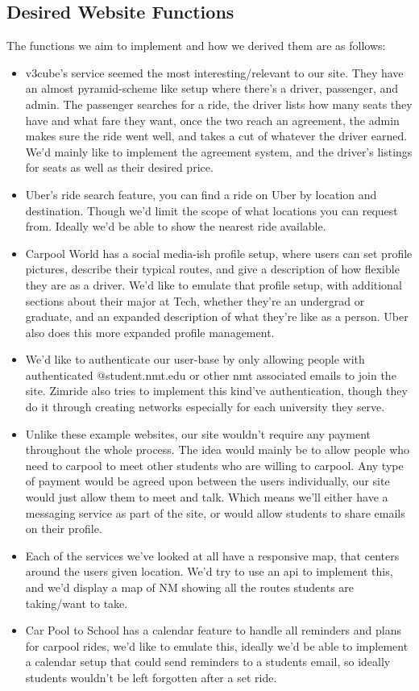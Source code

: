 \documentclass[10pt]{article}
\begin{document}
\subsection{Desired Website Functions}
The functions we aim to implement and how we derived them are as follows: 
\begin{itemize}
  \item v3cube's service seemed the most interesting/relevant to our site. They have an almost pyramid-scheme like setup where there's a driver, passenger, and admin. The passenger searches for a ride, the driver lists how many seats they have and what fare they want, once the two reach an agreement, the admin makes sure the ride went well, and takes a cut of whatever the driver earned. We'd mainly like to implement the agreement system, and the driver's listings for seats as well as their desired price.
  \item Uber's ride search feature, you can find a ride on Uber by location and destination. Though we'd limit the scope of what locations you can request from. Ideally we'd be able to show the nearest ride available.
  \item Carpool World has a social media-ish profile setup, where users can set profile pictures, describe their typical routes, and give a description of how flexible they are as a driver. We'd like to emulate that profile setup, with additional sections about their major at Tech, whether they're an undergrad or graduate, and an expanded description of what they're like as a person. Uber also does this more expanded profile management.
  \item We'd like to authenticate our user-base by only allowing people with authenticated @student.nmt.edu or other nmt associated emails to join the site. Zimride also tries to implement this kind've authentication, though they do it through creating networks especially for each university they serve.
  \item Unlike these example websites, our site wouldn't require any payment throughout the whole process. The idea would mainly be to allow people who need to carpool to meet other students who are willing to carpool. Any type of payment would be agreed upon between the users individually, our site would just allow them to meet and talk. Which means we'll either have a messaging service as part of the site, or would allow students to share emails on their profile.
  \item Each of the services we've looked at all have a responsive map, that centers around the users given location. We'd try to use an api to implement this, and we'd display a map of NM showing all the routes students are taking/want to take.
  \item Car Pool to School has a calendar feature to handle all reminders and plans for carpool rides, we'd like to emulate this, ideally we'd be able to implement a calendar setup that could send reminders to a students email, so ideally students wouldn't be left forgotten after a set ride.
\end{itemize}
\newpage
\end{document}
